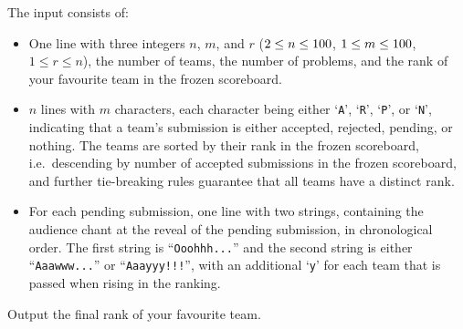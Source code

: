 \begin{Input}
    The input consists of:
    \vspace{-0.5em}%
    \begin{itemize}
        \item One line with three integers $n$, $m$, and $r$
            ($2\leq n\leq100$, $1\leq m\leq100$, $1\leq r\leq n$),
            the number of teams, the number of problems,
            and the rank of your favourite team in the frozen scoreboard.

        \item $n$ lines with $m$ characters,
            each character being either `\texttt{A}', `\texttt{R}', `\texttt{P}', or `\texttt{N}',
            indicating that a team's submission is either accepted, rejected, pending, or nothing.
            The teams are sorted by their rank in the frozen scoreboard,
            i.e.\ descending by number of accepted submissions in the frozen scoreboard,
            and further tie-breaking rules guarantee that all teams have a distinct rank.

        \item For each pending submission, one line with two strings,
            containing the audience chant at the reveal of the pending submission, in chronological order.
            The first string is ``\texttt{Ooohhh...}'' and the second string is either ``\texttt{Aaawww...}''
            or ``\texttt{Aaayyy!!!}'', with an additional `\texttt{y}' for each team that is passed when rising in the ranking.
    \end{itemize}
\end{Input}

\begin{Output}
    Output the final rank of your favourite team.
\end{Output}
